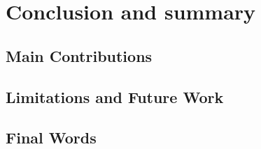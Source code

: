 \chapter{Conclusion and summary}

\section{Main Contributions}

\section{Limitations and Future Work}

\section{Final Words}
